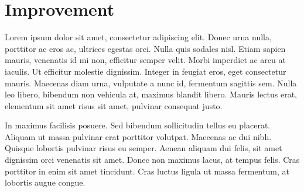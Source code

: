 \section{ Improvement }


Lorem ipsum dolor sit amet, consectetur adipiscing elit. Donec urna nulla, porttitor ac eros ac, ultrices egestas orci. 
Nulla quis sodales nisl. Etiam sapien mauris, venenatis id mi non, efficitur semper velit. Morbi imperdiet ac arcu at iaculis. 
Ut efficitur molestie dignissim. Integer in feugiat eros, eget consectetur mauris. Maecenas diam urna, vulputate a nunc id, fermentum sagittis sem. 
Nulla leo libero, bibendum non vehicula at, maximus blandit libero. Mauris lectus erat, elementum sit amet risus sit amet, pulvinar consequat justo. 


In maximus facilisis posuere. Sed bibendum sollicitudin tellus eu placerat. 
Aliquam ut massa pulvinar erat porttitor volutpat. Maecenas ac dui nibh. Quisque lobortis pulvinar risus eu semper. 
Aenean aliquam dui felis, sit amet dignissim orci venenatis sit amet. 
Donec non maximus lacus, at tempus felis. Cras porttitor in enim sit amet tincidunt. 
Cras luctus ligula ut massa fermentum, at lobortis augue congue. 

\pagebreak
